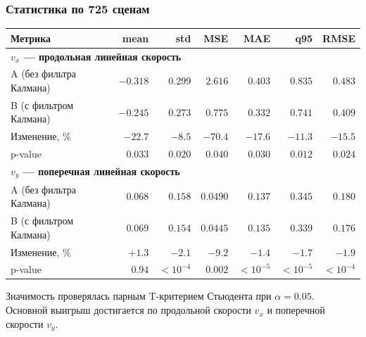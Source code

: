 \documentclass[pdf, hyperref={unicode}, aspectratio=169]{beamer}
\begin{document}
\begin{frame}
	\frametitle{Статистика по 725 сценам}
	\begin{center}
		\fontsize{9pt}{11pt}\selectfont
		\setlength{\tabcolsep}{4pt}
		\begin{tabular}{|l|r|r|r|r|r|r|}
			\hline
			Метрика & mean & std & MSE & MAE & q95 & RMSE \\
			\hline
			\multicolumn{7}{|l|}{\textbf{$v_x$ --- продольная линейная скорость}} \\
			\hline
			A (без фильтра Калмана) & $-0.318$ & $0.299$ & $2.616$ & $0.403$ & $0.835$ & $0.483$ \\
			\hline
			B (с фильтром Калмана)  & $-0.245$ & $0.273$ & $0.775$ & $0.332$ & $0.741$ & $0.409$ \\
			\hline
			Изменение, \% & {\color{green!50!black}$-22.7$} & {\color{green!50!black}$-8.5$} & {\color{green!50!black}$-70.4$} & {\color{green!50!black}$-17.6$} & {\color{green!50!black}$-11.3$} & {\color{green!50!black}$-15.5$} \\
			\hline
			p-value & {\color{green!50!black}$0.033$} & {\color{green!50!black}$0.020$} & {\color{green!50!black}$0.040$} & {\color{green!50!black}$0.030$} & {\color{green!50!black}$0.012$} & {\color{green!50!black}$0.024$} \\
			\hline
			\multicolumn{7}{|l|}{\textbf{$v_y$ --- поперечная линейная скорость}} \\
			\hline
			A (без фильтра Калмана) & $0.068$ & $0.158$ & $0.0490$ & $0.137$ & $0.345$ & $0.180$ \\
			\hline
			B (с фильтром Калмана)  & $0.069$ & $0.154$ & $0.0445$ & $0.135$ & $0.339$ & $0.176$ \\
			\hline
			Изменение, \% & $+1.3$ & {\color{green!50!black}$-2.1$} & {\color{green!50!black}$-9.2$} & {\color{green!50!black}$-1.4$} & {\color{green!50!black}$-1.7$} & {\color{green!50!black}$-1.9$} \\
			\hline
			p-value & $0.94$ & {\color{green!50!black}$<10^{-4}$} & {\color{green!50!black}$0.002$} & {\color{green!50!black}$<10^{-5}$} & {\color{green!50!black}$<10^{-5}$} & {\color{green!50!black}$<10^{-4}$} \\
			\hline
		\end{tabular}
	\end{center}
	\begin{center}\fontsize{9pt}{11pt}\selectfont
		Значимость проверялась парным T-критерием Стьюдента при $\alpha=0.05$.\\
		Основной выигрыш достигается по продольной скорости $v_x$ и поперечной скорости $v_y$.
	\end{center}
\end{frame}
\end{document}
